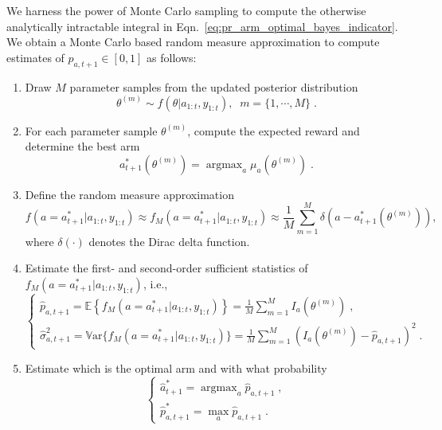 \documentclass{article}
\newcommand{\eValue}[1]{\mathbb{E}\left\{ #1 \right\}}
\newcommand{\ie}{i.e., }
\newcommand{\argmax}{\mathop{\mathrm{argmax}}}
\newcommand{\Var}{\mathbb{V}\mathrm{ar}}
\begin{document}
We harness the power of Monte Carlo sampling to compute the otherwise analytically intractable integral in Eqn.~\eqref{eq:pr_arm_optimal_bayes_indicator}. We obtain a Monte Carlo based random measure approximation to compute estimates of $p_{a,t+1}\in [0,1]$ as follows:
\begin{enumerate}
	\item Draw $M$ parameter samples from the updated posterior distribution
	\begin{equation}
	\theta^{(m)}\sim f(\theta|a_{1:t}, y_{1:t}), \; \; m=\{1, \cdots, M\} \; .
	\end{equation}
	\item For each parameter sample $\theta^{(m)}$, compute the expected reward and determine the best arm 
	\begin{equation}
	a_{t+1}^*(\theta^{(m)})=\argmax_{a}\mu_{a}(\theta^{(m)}) \; .
	\end{equation}
	\item Define the random measure approximation
	\begin{equation}
	f(a =a_{t+1}^*|a_{1:t}, y_{1:t}) \approx f_M(a =a_{t+1}^*|a_{1:t}, y_{1:t}) \approx \frac{1}{M} \sum_{m=1}^M \delta\left(a - a_{t+1}^*(\theta^{(m)}) \right) ,
	\label{eq:pr_arm_optimal_bayes_MC}
	\end{equation}
	where $\delta(\cdot)$ denotes the Dirac delta function.
	\item Estimate the first- and second-order sufficient statistics of $f_M(a =a_{t+1}^*|a_{1:t}, y_{1:t})$, \ie 
	\begin{equation}
	\begin{cases}
	\hat{p}_{a,t+1}=\eValue{f_M(a =a_{t+1}^*|a_{1:t}, y_{1:t})} =\frac{1}{M}\sum_{m=1}^M I_a\left(\theta^{(m)}\right) \; , \\
	\hat{\sigma}^2_{a,t+1}=\Var\{f_M(a =a_{t+1}^*|a_{1:t}, y_{1:t})\} =\frac{1}{M} \sum_{m=1}^M \left(I_a\left(\theta^{(m)}\right)- \hat{p}_{a,t+1} \right)^2 \; .
	\end{cases}
	\label{eq:pr_arm_optimal_bayes_MC_suff_statistics}
	\end{equation}
	\item Estimate which is the optimal arm and with what probability
	\begin{equation}
	\begin{cases}
	\hat{a}_{t+1}^* =\argmax_{a} \hat{p}_{a,t+1} \; ,  \\
	\hat{p}^*_{a,t+1}=\max_{a} \hat{p}_{a,t+1} \; .
	\end{cases}
	\end{equation}
\end{enumerate}
\end{document}
